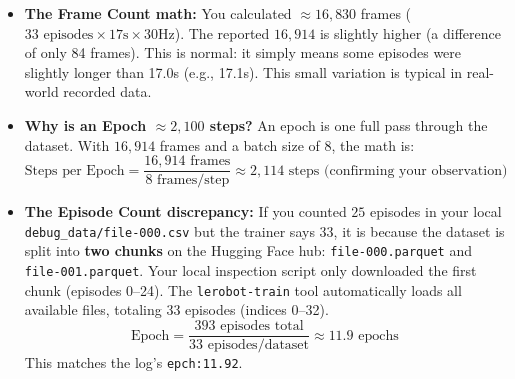 \documentclass[11pt,a4paper]{article}
\begin{document}
\begin{itemize}
    \item \textbf{The Frame Count math:} 
    You calculated $\approx 16,830$ frames ($33 \text{ episodes} \times 17\text{s} \times 30\text{Hz}$). The reported $16,914$ is slightly higher (a difference of only 84 frames). This is normal: it simply means some episodes were slightly longer than 17.0s (e.g., 17.1s). This small variation is typical in real-world recorded data.
    
    \item \textbf{Why is an Epoch $\approx 2,100$ steps?} 
    An epoch is one full pass through the dataset. With $16,914$ frames and a batch size of $8$, the math is:
    \[ \text{Steps per Epoch} = \frac{16,914 \text{ frames}}{8 \text{ frames/step}} \approx 2,114 \text{ steps} \text{ (confirming your observation)} \]
    
    \item \textbf{The Episode Count discrepancy:}
    If you counted $25$ episodes in your local \texttt{debug\_data/file-000.csv} but the trainer says $33$, it is because the dataset is split into \textbf{two chunks} on the Hugging Face hub: \texttt{file-000.parquet} and \texttt{file-001.parquet}. Your local inspection script only downloaded the first chunk (episodes 0--24). The \texttt{lerobot-train} tool automatically loads all available files, totaling 33 episodes (indices 0--32).
    \[ \text{Epoch} = \frac{393 \text{ episodes total}}{33 \text{ episodes/dataset}} \approx 11.9 \text{ epochs} \]
    This matches the log's \texttt{epch:11.92}.
\end{itemize}
\end{document}
